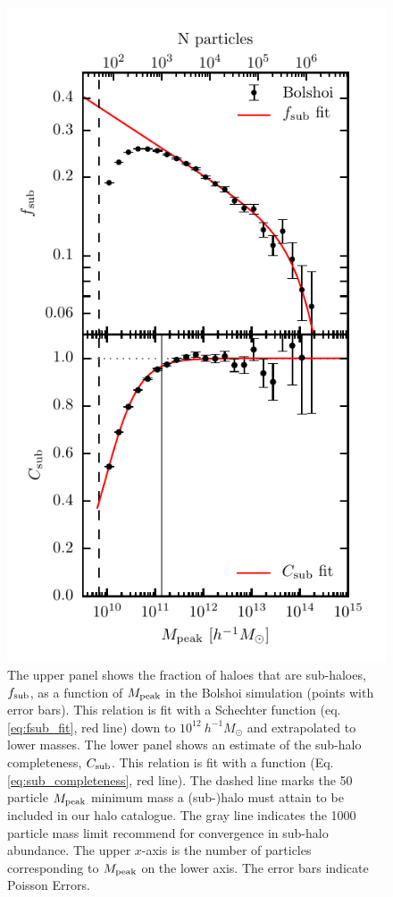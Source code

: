 \documentclass[useAMS,fleqn,usenatbib]{mnras}
\begin{document}
\begin{figure}
    \includegraphics[width=\columnwidth]{figures/sub_fraction_and_completeness.pdf}
    \caption{The upper panel shows the fraction of haloes that are sub-haloes, $f_{\rm sub}$, as a function of $M_{\rm peak}$ in the Bolshoi simulation (points with error bars).  This relation is fit with a Schechter function (eq. \ref{eq:fsub_fit}, red line) down to $10^{12} ~ h^{-1}M_{\odot}$ and extrapolated to lower masses.  The lower panel shows an estimate of the sub-halo completeness, $C_{\rm sub}$.  This relation is fit with a function (Eq. \ref{eq:sub_completeness}, red line).   The dashed line marks the 50 particle $M_{\rm peak}$ minimum mass a (sub-)halo must attain to be included in our halo catalogue.  The gray line indicates the 1000 particle mass limit \citet{Guo:2013fm} recommend for convergence in sub-halo abundance.  The upper $x$-axis is the number of particles corresponding to $M_{\rm peak}$ on the lower axis.  The error bars indicate Poisson Errors.}
    \label{fig:f_sub}
\end{figure}
\end{document}
